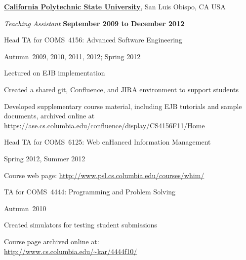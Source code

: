 \documentclass[10pt]{article}
\begin{document}
\href{http://www.calpoly.edu/}{\textbf{California Polytechnic State University}},
San Luis Obispo, CA USA
\begin{outerlist}
\item[] \textit{Teaching Assistant}%
    \hfill \textbf{September 2009 to December 2012}
    \begin{innerlist}%
       \item Head TA for COMS~4156: Advanced Software Engineering %
        \begin{innerlist}
            \item Autumn~2009, 2010, 2011, 2012; Spring 2012 
            \item Lectured on EJB implementation
            \item Created a shared git, Confluence, and JIRA environment to support students
            \item Developed supplementary course
                material, including EJB tutorials and sample documents, archived online at \\
                 \url{https://ase.cs.columbia.edu/confluence/display/CS4156F11/Home}
        \end{innerlist}
            \item Head TA for COMS~6125: Web enHanced Information Management
            \begin{innerlist}
	   \item Spring 2012, Summer 2012
            \item Course web page: 
                 \url{http://www.psl.cs.columbia.edu/courses/whim/}
        \end{innerlist}

         \item TA for COMS~4444: Programming and Problem Solving
        \begin{innerlist}
            \item Autumn~2010
            \item Created simulators for testing student submissions
            \item Course page archived online at: \\
            \href{http://www.cs.columbia.edu/~kar/4444f10/}{http://www.cs.columbia.edu/\~{}kar/4444f10/}
        \end{innerlist}
\end{innerlist}


\end{outerlist}
\end{document}
